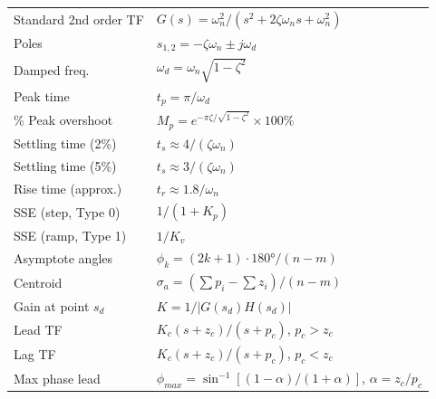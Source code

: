 \documentclass[12pt,a4paper]{article}
\begin{document}
\begin{tcolorbox}[formulabox, title={\textbf{Key Formulas at a Glance}}]
\begin{tabularx}{\linewidth}{B{5.0cm} X}
Standard 2nd order TF      & $G(s) = \omega_n^2/(s^2+2\zeta\omega_n s+\omega_n^2)$ \\[2pt]
Poles                      & $s_{1,2} = -\zeta\omega_n \pm j\omega_d$ \\[2pt]
Damped freq.               & $\omega_d = \omega_n\sqrt{1-\zeta^2}$ \\[2pt]
Peak time                  & $t_p = \pi/\omega_d$ \\[2pt]
\% Peak overshoot          & $M_p = e^{-\pi\zeta/\sqrt{1-\zeta^2}}\times100\%$ \\[2pt]
Settling time (2\%)        & $t_s \approx 4/(\zeta\omega_n)$ \\[2pt]
Settling time (5\%)        & $t_s \approx 3/(\zeta\omega_n)$ \\[2pt]
Rise time (approx.)        & $t_r \approx 1.8/\omega_n$ \\[2pt]
SSE (step, Type 0)         & $1/(1+K_p)$ \\[2pt]
SSE (ramp, Type 1)         & $1/K_v$ \\[2pt]
Asymptote angles           & $\phi_k = (2k+1)\cdot180°/(n-m)$ \\[2pt]
Centroid                   & $\sigma_a = (\sum p_i - \sum z_i)/(n-m)$ \\[2pt]
Gain at point $s_d$        & $K = 1/|G(s_d)H(s_d)|$ \\[2pt]
Lead TF                    & $K_c(s+z_c)/(s+p_c)$, $p_c>z_c$ \\[2pt]
Lag TF                     & $K_c(s+z_c)/(s+p_c)$, $p_c<z_c$ \\[2pt]
Max phase lead             & $\phi_{max}=\sin^{-1}[(1-\alpha)/(1+\alpha)]$, $\alpha=z_c/p_c$
\end{tabularx}
\end{tcolorbox}

\vspace{5pt}
\end{document}
